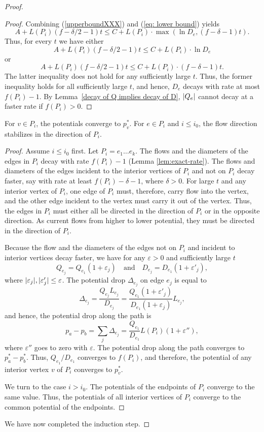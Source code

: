 \documentclass[11pt,a4paper]{article}
\begin{document}
\begin{proof}
\begin{proof}
Combining (\ref{upperboundXXX}) and (\ref{eq: lower bound}) yields
\[  A  + L(P_i) (f  - \delta/2  - 1) t \le C + L(P_i) \cdot
\max(\ln D_e, (f - \delta - 1)t).\]
Thus, for every $t$ we have either
\[  A  + L(P_i) (f  - \delta/2 - 1) t \le C + L(P_i) \cdot \ln
D_e \]
or 
\[ A  + L(P_i) (f  - \delta/2 - 1) t \le C + L(P_i) \cdot (f -
\delta - 1)t .\]
The latter inequality does not hold for any sufficiently large $t$. Thus, the
former inequality holds for all sufficiently large $t$, and hence, $D_e$ decays
with rate at most $f(P_i) - 1$. By Lemma~\ref{decay of Q implies decay of D},
$| Q_e |$ cannot decay at a faster rate if $f(P_i) > 0$. 
\end{proof}

\begin{lemma} For $v \in P_i$, the potentials converge to $p^*_v$. For $e \in
P_i$ and $i \le i_0$, the flow direction stabilizes in the direction of $P_i$. \end{lemma}
\begin{proof} Assume $i \le i_0$ first. Let $P_i = e_1 \ldots e_k$. The flows
and the diameters of the edges in $P_i$ decay with rate $f(P_i) - 1$ (Lemma \ref{lem:exact-rate}). The flows
and diameters of the edges incident to the interior vertices of $P_i$ and not
on $P_i$ decay faster, say with rate at least $f(P_i) - \delta - 1$, where
$\delta > 0$. For large $t$ and any interior vertex of $P_i$, one edge of $P_i$
must, therefore, carry flow into the vertex, and the other edge incident to the
vertex must carry it out of the vertex. Thus, the edges in $P_i$ must either
all be
directed in the direction of $P_i$ or in the opposite direction. As current
flows from higher to lower potential, they must be directed in the direction of
$P_i$. 

Because the flow and the diameters of the edges not on $P_i$ and incident to
interior vertices decay faster, we have for any $\varepsilon > 0$ and sufficiently large $t$
\[   Q_{e_j} = Q_{e_1}(1 + \varepsilon_j)\quad\text{and}\quad D_{e_j}=
D_{e_1}(1 + \varepsilon'_j),\]
where $| \varepsilon_j |,| \varepsilon'_j | \le \varepsilon$. The 
potential drop $\Delta_{e_j}$ on edge $e_j$ is equal to 
\[  \Delta_{e_j} = \frac{Q_{e_j} L_{e_j}}{D_{e_j}} =  \frac{Q_{e_1}(1 +
\varepsilon'_j)}{D_{e_1}(1 + \varepsilon_j)} L_{e_j}, \]
and hence, the potential drop along the path is 
\[   p_a - p_b = \sum_j \Delta_{e_j} = \frac{Q_{e_1}}{D_{e_1}} L(P_i) (1 +
\varepsilon''), \]
where $\varepsilon''$ goes to zero with $\varepsilon$. 
The potential drop along the path converges to $p^*_a - p^*_b$. Thus,
${Q_{e_1}}/{D_{e_1}}$ converges to $f(P_i)$, and therefore, the potential of any
interior vertex $v$ of $P_i$ converges to $p^*_v$. 

We turn to the case $i > i_0$. The potentials of the endpoints of $P_i$
converge to the same value. Thus, the potentials of all interior vertices of
$P_i$ converge to the common potential of the endpoints. 
\end{proof}

We have now completed the induction step. \end{proof}
\end{document}
